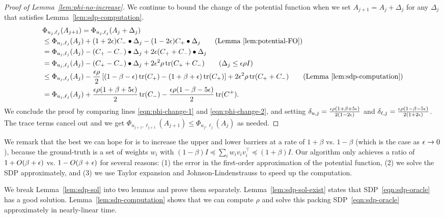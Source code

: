 \begin{proof}[Proof of Lemma~\ref{lem:phi-no-increase}]
We continue to bound the change of the potential function when we set $A_{j+1} = A_j + \Delta_j$ for any $\Delta_j$ that satisfies Lemma~\ref{lem:sdp-computation}.
\begin{align}
& \Phi_{u_j,\ell_j}(A_{j+1})
= \Phi_{u_j,\ell_j}(A_{j} + \Delta_j) \notag \\
& \le \Phi_{u_j, \ell_j}(A_j) + (1+2\eps) C_- \bullet \Delta_j - (1-2\eps) C_+ \bullet \Delta_j \tag{Lemma~\ref{lem:potential-FO}} \\
& = \Phi_{u_j, \ell_j}(A_j) - (C_+ - C_-) \bullet \Delta_j + 2\eps (C_+ + C_-) \bullet \Delta_j \notag \\
& = \Phi_{u_j, \ell_j}(A_j) - (C_+ - C_-) \bullet \Delta_j + 2\eps^2\rho \tr(C_+ + C_-) \tag{$\Delta_j \le \eps\rho I$} \notag \\
& \le \Phi_{u_j, \ell_j}(A_j) - \frac{\eps\rho}{2}\left[(1-\beta-\eps)\tr(C_+) - (1+\beta+\eps)\tr(C_+)\right] + 2\eps^2 \rho\tr(C_+ + C_-) \tag{Lemma~\ref{lem:sdp-computation}} \\
& = \Phi_{u_j, \ell_j}(A_j) + \frac{\eps\rho(1+\beta+5\eps)}{2} \tr(C_-) - \frac{\eps\rho(1-\beta-5\eps)}{2} \tr(C^+) \label{eqn:phi-change-2}.
\end{align}
We conclude the proof by comparing lines \eqref{eqn:phi-change-1} and \eqref{eqn:phi-change-2}, and setting $\delta_{u,j} = \frac{\epsilon\rho(1+\beta+5\epsilon)}{2(1-2\epsilon)}$ and $\delta_{\ell,j} = \frac{\epsilon\rho(1-\beta-5\epsilon)}{2(1+2\epsilon)}$.
The trace terms cancel out and we get $\Phi_{u_{j+1},\ell_{j+1}}(A_{j+1}) \le \Phi_{u_{j},\ell_{j}}(A_{j})$ as needed.
\end{proof}

We remark that the best we can hope for is to increase the upper and lower barriers at a rate of $1+\beta$ vs. $1-\beta$ (which is the case as $\epsilon \to 0$), because the ground-truth is a set of weights $w_i$ with $(1-\beta) I \preceq \sum_i w_i v_i v_i^\top \preceq (1+\beta) I$. Our algorithm only achieves a ratio of $1+O(\beta+\epsilon)$ vs. $1-O(\beta+\epsilon)$ for several reasons: (1) the error in the first-order approximation of the potential function, (2) we solve the SDP approximately, and (3) we use Taylor expansion and Johnson-Lindenstrauss to speed up the computation.



We break Lemma~\ref{lem:sdp-sol} into two lemmas and prove them separately.
Lemma~\ref{lem:sdp-sol-exist} states that SDP~\eqref{eqn:sdp-oracle} has a good solution. Lemma~\ref{lem:sdp-computation} shows that we can compute $\rho$ and solve this packing SDP~\eqref{eqn:sdp-oracle} approximately in nearly-linear time.

